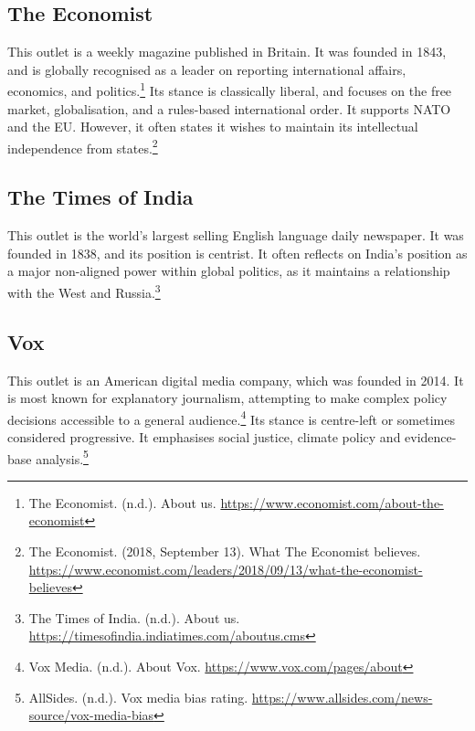 \subsection{The Economist}

This outlet is a weekly magazine published in Britain. It was founded in 1843, and is globally recognised as a leader on reporting international affairs, economics, and politics.\footnote{The Economist. (n.d.). About us. \url{https://www.economist.com/about-the-economist}} Its stance is classically liberal, and focuses on the free market, globalisation, and a rules-based international order. It supports NATO and the EU. However, it often states it wishes to maintain its intellectual independence from states.\footnote{The Economist. (2018, September 13). What The Economist believes. \url{https://www.economist.com/leaders/2018/09/13/what-the-economist-believes}}

\subsection{The Times of India}

This outlet is the world’s largest selling English language daily newspaper. It was founded in 1838, and its position is centrist. It often reflects on India’s position as a major non-aligned power within global politics, as it maintains a relationship with the West and Russia.\footnote{The Times of India. (n.d.). About us. \url{https://timesofindia.indiatimes.com/aboutus.cms}}

\subsection{Vox}

This outlet is an American digital media company, which was founded in 2014. It is most known for explanatory journalism, attempting to make complex policy decisions accessible to a general audience.\footnote{Vox Media. (n.d.). About Vox. \url{https://www.vox.com/pages/about}} Its stance is centre-left or sometimes considered progressive. It emphasises social justice, climate policy and evidence-base analysis.\footnote{AllSides. (n.d.). Vox media bias rating. \url{https://www.allsides.com/news-source/vox-media-bias}}
